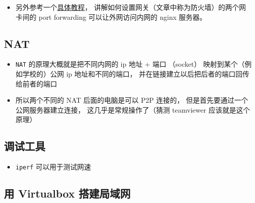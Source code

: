 \begin{itemize}
\item 另外参考一个\href{https://www.digitalocean.com/community/tutorials/how-to-forward-ports-through-a-linux-gateway-with-iptables}{具体教程}， 讲解如何设置网关（文章中称为防火墙）的两个网卡间的 port forwarding 可以让外网访问内网的 nginx 服务器。 
\end{itemize}

\subsection{NAT}
\begin{itemize}
\item \verb|NAT| 的原理大概就是把不同内网的 ip 地址 + 端口 （socket） 映射到某个（例如学校的）公网 ip 地址和不同的端口， 并在链接建立以后把后者的端口回传给前者的端口
\item 所以两个不同的 NAT 后面的电脑是可以 P2P 连接的， 但是首先要通过一个公网服务器建立连接， 这几乎是常规操作了（猜测 teamviewer 应该就是这个原理）
\end{itemize}

\subsection{调试工具}
\begin{itemize}
\item \verb|iperf| 可以用于测试网速
\end{itemize}


\subsection{用 Virtualbox 搭建局域网}\label{LinWeb_sub1}

